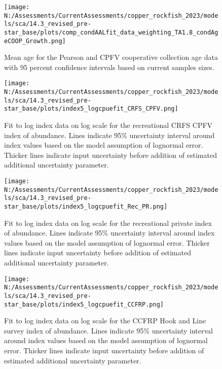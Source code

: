 \documentclass[11pt,
  english,
  letterpaper,
]{article}
\begin{document}
\pagebreak

\begin{figure}
\centering
\texttt{[image: N:/Assessments/CurrentAssessments/copper\_rockfish\_2023/models/sca/14.3\_revised\_pre-star\_base/plots/comp\_condAALfit\_data\_weighting\_TA1.8\_condAgeCOOP\_Growth.png]}
\caption{Mean age for the Pearson and CPFV cooperative collection age data with 95 percent confidence intervals based on current samples sizes.\label{fig:coop-mean-age-fit}}
\end{figure}

\pagebreak

\begin{figure}
\centering
\texttt{[image: N:/Assessments/CurrentAssessments/copper\_rockfish\_2023/models/sca/14.3\_revised\_pre-star\_base/plots/index5\_logcpuefit\_CRFS\_CPFV.png]}
\caption{Fit to log index data on log scale for the recreational CRFS CPFV index of abundance. Lines indicate 95\% uncertainty interval around index values based on the model assumption of lognormal error. Thicker lines indicate input uncertainty before addition of estimated additional uncertainty parameter.\label{fig:crfs-cpfv-index-fit}}
\end{figure}

\pagebreak

\begin{figure}
\centering
\texttt{[image: N:/Assessments/CurrentAssessments/copper\_rockfish\_2023/models/sca/14.3\_revised\_pre-star\_base/plots/index5\_logcpuefit\_Rec\_PR.png]}
\caption{Fit to log index data on log scale for the recreational private index of abundance. Lines indicate 95\% uncertainty interval around index values based on the model assumption of lognormal error. Thicker lines indicate input uncertainty before addition of estimated additional uncertainty parameter.\label{fig:crfs-pr-index-fit}}
\end{figure}

\pagebreak

\begin{figure}
\centering
\texttt{[image: N:/Assessments/CurrentAssessments/copper\_rockfish\_2023/models/sca/14.3\_revised\_pre-star\_base/plots/index5\_logcpuefit\_CCFRP.png]}
\caption{Fit to log index data on log scale for the CCFRP Hook and Line survey index of abundance. Lines indicate 95\% uncertainty interval around index values based on the model assumption of lognormal error. Thicker lines indicate input uncertainty before addition of estimated additional uncertainty parameter.\label{fig:ccfrp-index-fit}}
\end{figure}
\end{document}
